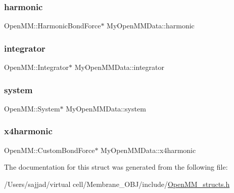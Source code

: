 \subsubsection{\texorpdfstring{harmonic}{harmonic}}
{\footnotesize\ttfamily Open\+M\+M\+::\+Harmonic\+Bond\+Force$\ast$ My\+Open\+M\+M\+Data\+::harmonic}

\mbox{\label{structMyOpenMMData_a471489f3c9bd1e5a54fc5202b71b6b96}} 
\subsubsection{\texorpdfstring{integrator}{integrator}}
{\footnotesize\ttfamily Open\+M\+M\+::\+Integrator$\ast$ My\+Open\+M\+M\+Data\+::integrator}

\mbox{\label{structMyOpenMMData_ad14c08e4c616766db92ae52e57b44480}} 
\subsubsection{\texorpdfstring{system}{system}}
{\footnotesize\ttfamily Open\+M\+M\+::\+System$\ast$ My\+Open\+M\+M\+Data\+::system}

\mbox{\label{structMyOpenMMData_ac7bcf8c5273a640f7f606bda799fba37}} 
\subsubsection{\texorpdfstring{x4harmonic}{x4harmonic}}
{\footnotesize\ttfamily Open\+M\+M\+::\+Custom\+Bond\+Force$\ast$ My\+Open\+M\+M\+Data\+::x4harmonic}



The documentation for this struct was generated from the following file\+:\begin{DoxyCompactItemize}
\item 
/\+Users/sajjad/virtual cell/\+Membrane\+\_\+\+O\+B\+J/include/\mbox{\hyperlink{OpenMM__structs_8h}{Open\+M\+M\+\_\+structs.\+h}}\end{DoxyCompactItemize}
